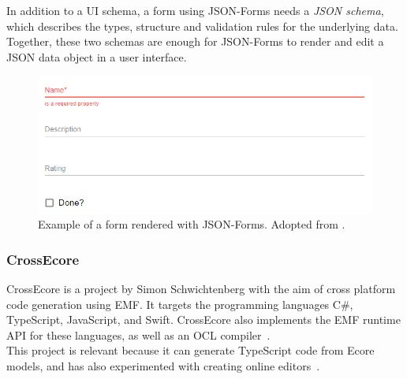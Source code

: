 In addition to a UI schema, a form using JSON-Forms needs a \textit{JSON schema}, which describes the types, structure and validation rules for the underlying data.
Together, these two schemas are enough for JSON-Forms to render and edit a \gls{JSON} data object in a user interface.

\begin{figure}[htbp]  %
  \centering
  \includegraphics[width=\textwidth]{figures/pre-project/json-forms-example.png}
  \caption[JSON-Forms Example]{Example of a form rendered with JSON-Forms. Adopted from \cite{eclipsesourceWhatJSONForms}.}\label{fig:json-forms-example}
\end{figure}

\subsubsection{CrossEcore}
CrossEcore is a project by Simon Schwichtenberg with the aim of cross platform code generation using \acrshort{EMF}.
It targets the programming languages C\#, TypeScript, JavaScript, and Swift.
CrossEcore also implements the \acrshort{EMF} runtime \acrshort{API} for these languages, as well as an \gls{OCL} compiler~\cite{simonschwichtenbergCrossecoreEcoretypescript2021}.\\

This project is relevant because it can generate TypeScript code from \gls{Ecore} models, and has also experimented with creating online editors~\cite{simonschwichtenbergCrossEcore}.

